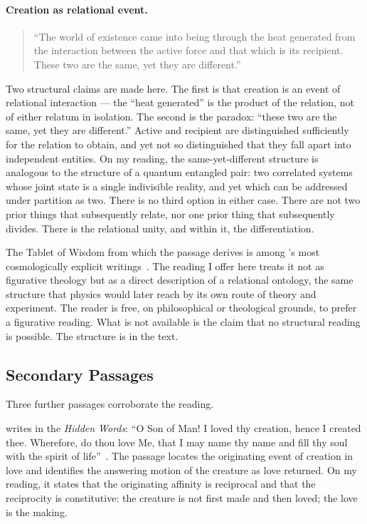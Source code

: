 \paragraph{Creation as relational event.}
\begin{quote}
``The world of existence came into being through the heat generated
from the interaction between the active force and that which is its recipient.
These two are the same, yet they are different.''
\citep[p.~140]{TabletsBahaullah}
\end{quote}

Two structural claims are made here.
The first is that creation is an event of relational interaction --- the
``heat generated'' is the product of the relation, not of either relatum in
isolation.
The second is the paradox: ``these two are the same, yet they are different.''
Active and recipient are distinguished sufficiently for the relation to obtain,
and yet not so distinguished that they fall apart into independent entities.
On my reading, the same-yet-different structure is analogous to the structure of a quantum
entangled pair: two correlated systems whose joint state is a single
indivisible reality, and yet which can be addressed under partition as two.
There is no third option in either case.
There are not two prior things that subsequently relate, nor one prior thing
that subsequently divides.
There is the relational unity, and within it, the differentiation.

The Tablet of Wisdom from which the passage derives is among
\Bahaullah's most cosmologically explicit writings~\citep{TabletsBahaullah}.
The reading I offer here treats it not as figurative theology but as a direct
description of a relational ontology, the same structure that physics would
later reach by its own route of theory and experiment.
The reader is free, on philosophical or theological grounds, to prefer a
figurative reading.
What is not available is the claim that no structural reading is possible.
The structure is in the text.

\subsection{Secondary Passages}

Three further passages corroborate the reading.

\Bahaullah writes in the \textit{Hidden Words}:
``O Son of Man! I loved thy creation, hence I created thee.
Wherefore, do thou love Me, that I may name thy name and fill thy soul
with the spirit of life''~\citep[Arabic 4]{HiddenWords}.
The passage locates the originating event of creation in love and identifies
the answering motion of the creature as love returned.
On my reading, it states that the originating affinity is reciprocal and
that the reciprocity is constitutive:
the creature is not first made and then loved; the love is the making.

